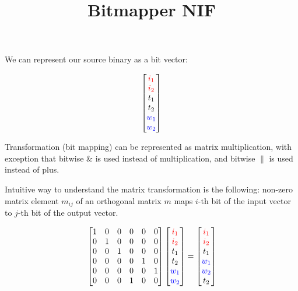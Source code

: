 \documentclass{article}
\title{Bitmapper NIF}
\begin{document}
\maketitle

We can represent our source binary as a bit vector:

\begin{equation}
  \label{eq:vec1}
  \begin{bmatrix}
    {\color{red} i_1} \\
    {\color{red} i_2} \\
    t_1 \\
    t_2 \\
    {\color{blue} w_1} \\
    {\color{blue} w_2}
  \end{bmatrix}
\end{equation}

Transformation (bit mapping) can be represented as matrix multiplication,
with exception that bitwise $\&$ is used instead of multiplication, and bitwise $\|$ is used instead of plus.

Intuitive way to understand the matrix transformation is the following:
non-zero matrix element $m_{i j}$ of an orthogonal matrix $m$ maps $i$-th bit of the input vector to $j$-th bit of the output vector.

\begin{equation}
  \label{eq:trans1}
  \begin{bmatrix}
    1 & 0 &   0 & 0 &  0 & 0 \\
    0 & 1 &   0 & 0 &  0 & 0 \\
    0 & 0 &   1 & 0 &  0 & 0 \\
    0 & 0 &   0 & 0 &  1 & 0 \\
    0 & 0 &   0 & 0 &  0 & 1 \\
    0 & 0 &   0 & 1 &  0 & 0
  \end{bmatrix}
  \begin{bmatrix}
    {\color{red} i_1} \\
    {\color{red} i_2} \\
    t_1 \\
    t_2 \\
    {\color{blue} w_1} \\
    {\color{blue} w_2}
  \end{bmatrix}
  =
  \begin{bmatrix}
    {\color{red} i_1} \\
    {\color{red} i_2} \\
    t_1 \\
    {\color{blue} w_1} \\
    {\color{blue} w_2} \\
    t_2
  \end{bmatrix}
\end{equation}
\end{document}

